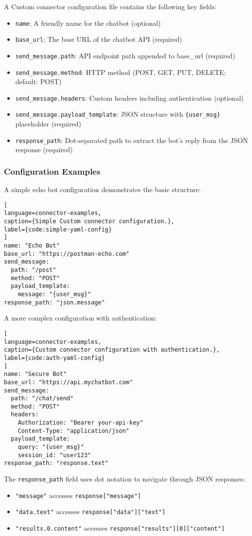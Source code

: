 A Custom connector configuration file contains the following key fields:

\begin{itemize}
    \item \texttt{name}: A friendly name for the chatbot (optional)
    \item \texttt{base\_url}: The base \acs{URL} of the chatbot \ac{API} (required)
    \item \texttt{send\_message.path}: \ac{API} endpoint path appended to base\_url (required)
    \item \texttt{send\_message.method}: \acs{HTTP} method (POST, GET, PUT, DELETE; default: POST)
    \item \texttt{send\_message.headers}: Custom headers including authentication (optional)
    \item \texttt{send\_message.payload\_template}: \acs{JSON} structure with \texttt{\{user\_msg\}} placeholder (required)
    \item \texttt{response\_path}: Dot-separated path to extract the bot's reply from the \acs{JSON} response (required)
\end{itemize}

\subsubsection{Configuration Examples}

A simple echo bot configuration demonstrates the basic structure:

\begin{lstlisting}[
language=connector-examples,
caption={Simple Custom connector configuration.},
label={code:simple-yaml-config}
]
name: "Echo Bot"
base_url: "https://postman-echo.com"
send_message:
  path: "/post"
  method: "POST"
  payload_template:
    message: "{user_msg}"
response_path: "json.message"
\end{lstlisting}

A more complex configuration with authentication:

\begin{lstlisting}[
language=connector-examples,
caption={Custom connector configuration with authentication.},
label={code:auth-yaml-config}
]
name: "Secure Bot"
base_url: "https://api.mychatbot.com"
send_message:
  path: "/chat/send"
  method: "POST"
  headers:
    Authorization: "Bearer your-api-key"
    Content-Type: "application/json"
  payload_template:
    query: "{user_msg}"
    session_id: "user123"
response_path: "response.text"
\end{lstlisting}

The \texttt{response\_path} field uses dot notation to navigate through \ac{JSON} responses:
\begin{itemize}
  \item \texttt{"message"} accesses \texttt{response["message"]}
  \item \texttt{"data.text"} accesses \texttt{response["data"]["text"]}
  \item \texttt{"results.0.content"} accesses
\texttt{response["results"][0]["content"]}
\end{itemize}
